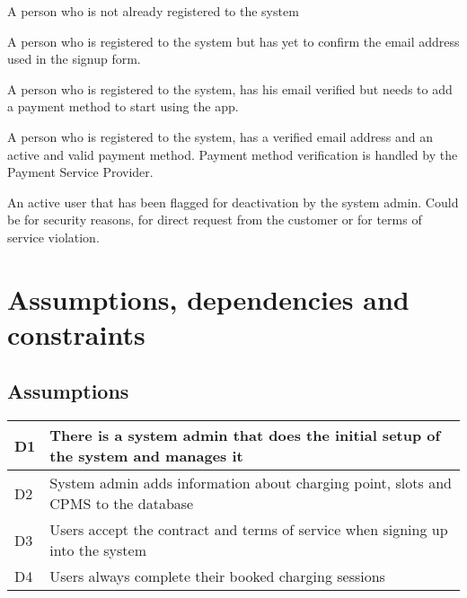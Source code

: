 \begin{enumerate}
	A person who is not already registered to the system
	
	A person who is registered to the system but has yet to confirm the email address used in the signup form.
	
	A person who is registered to the system, has his email verified but needs to add a payment method to start using the app.

	A person who is registered to the system, has a verified email address and an active and valid payment method. Payment method verification is handled by the Payment Service Provider.
	
	An active user that has been flagged for deactivation by the system admin. Could be for security reasons, for direct request from the customer or for terms of service violation.

\end{enumerate}

\section{Assumptions, dependencies and constraints}

\subsection{Assumptions}
\begin{tabular}{|l|l|}
	\hline
	D1 & There is a system admin that does the initial setup of the system and manages it\\
	\hline
	D2 & System admin adds information about charging point, slots and CPMS to the database\\
	\hline
	D3 & Users accept the contract and terms of service when signing up into the system\\
	\hline
	D4 & Users always complete their booked charging sessions\\
	\hline
\end{tabular}





















